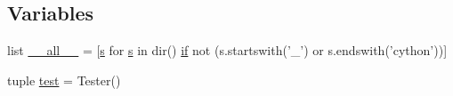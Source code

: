 \subsection*{Variables}
\begin{DoxyCompactItemize}
\item 
list \hyperlink{namespacescipy_1_1stats_aedec9811e2f47e4a4ec3a0f4ca61ad7f}{\+\_\+\+\_\+all\+\_\+\+\_\+} = \mbox{[}\hyperlink{indexexpr_8h_ae024b0db549122b44c349ae28ec990dc}{s} for \hyperlink{indexexpr_8h_ae024b0db549122b44c349ae28ec990dc}{s} in dir() \hyperlink{minmax_8h_a30a0ee9fee303f01d9c5e6f669e0dfe9}{if} not (s.\+startswith('\+\_\+') or s.\+endswith('cython'))\mbox{]}
\item 
tuple \hyperlink{namespacescipy_1_1stats_a5d5d5b15ae3ec7287f266c00c86df9b1}{test} = Tester()
\end{DoxyCompactItemize}


